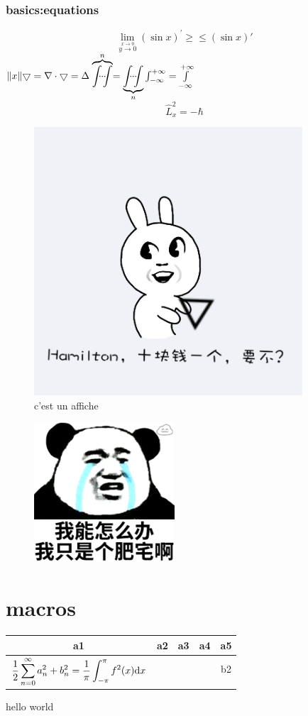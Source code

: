 \documentclass{article}[20pt]{}
\begin{document}
\section{basics:equations}
$$\lim_{\stackrel{x\to 0}{y \to 0} }(\sin x)^{\prime}\ge\le(\sin x)'$$
$\|x\|\bigtriangledown=\nabla\cdot\bigtriangledown=\Delta
  \stackrel{n}{{\overbrace{\idotsint}}}=\underbrace{\idotsint}\limits_{n}\int_{-\infty}^{+\infty}=\int\limits_{-\infty}^{+\infty}
$
\begin{equation}
\hat{L}_x^2=-\hbar
\end{equation}
\begin{figure}
	\includegraphics[width=10cm,height=10cm]{2}
	\caption[affiche 1]{c'est un affiche}
	\label{fig:2}
\end{figure}
\begin{figure}
	\includegraphics{1}
	\caption{}
	\label{fig:1}
\end{figure}
\part{macros}\cite{key}
\begin{longtable}{|c|c|cc|c|}\hline
a1 & a2 & a3 & a4 & a5\\ \hline
\multirow{3}{*}{$\displaystyle\frac{1}{2}\sum_{n=0}^\infty a_n^2+b_n^2 =\frac{1}{\pi}\int_{-\pi}^{\pi}f^2(x)\mathrm{d} x$}&&&& \multirow{2}{*}{b2}\\
&&&&\\\cline{2-5}
&&&&\\\hline
\end{longtable}
\begin{finale}
	hello world
\end{finale}
\end{document}
